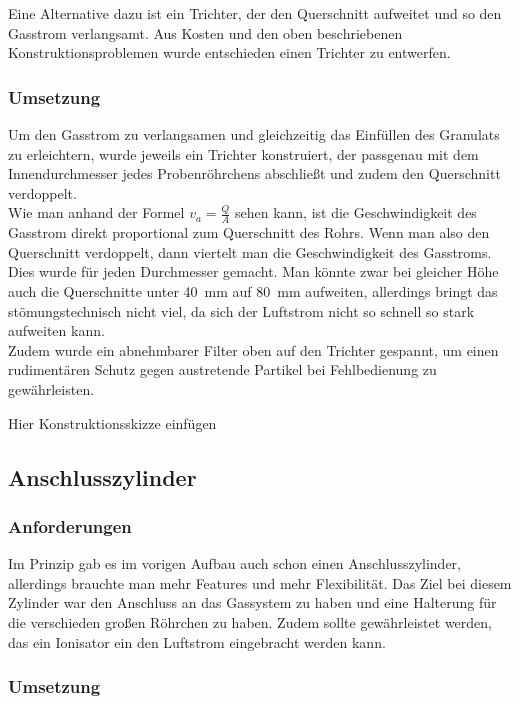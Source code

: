 Eine Alternative dazu ist ein Trichter, der den Querschnitt aufweitet und so den Gasstrom verlangsamt. Aus Kosten und den oben beschriebenen Konstruktionsproblemen wurde entschieden einen Trichter zu entwerfen.



\subsubsection{Umsetzung}

Um den Gasstrom zu verlangsamen und gleichzeitig das Einfüllen des Granulats zu erleichtern, wurde jeweils ein Trichter konstruiert, der passgenau mit dem Innendurchmesser jedes Probenröhrchens abschließt und zudem den Querschnitt verdoppelt. \\
Wie man anhand der Formel $v_a = \frac{Q}{A}$ \cite{Grollius2012} sehen kann, ist die Geschwindigkeit des Gasstrom direkt proportional zum Querschnitt des Rohrs. Wenn man also den Querschnitt verdoppelt, dann viertelt man die Geschwindigkeit des Gasstroms. Dies wurde für jeden Durchmesser gemacht. Man könnte zwar bei gleicher Höhe auch die Querschnitte unter \SI{40}{mm} auf \SI{80}{mm} aufweiten, allerdings bringt das stömungstechnisch nicht viel, da sich der Luftstrom nicht so schnell so stark aufweiten kann. \\
Zudem wurde ein abnehmbarer Filter oben auf den Trichter gespannt, um einen rudimentären Schutz gegen austretende Partikel bei Fehlbedienung zu gewährleisten.

Hier Konstruktionsskizze einfügen


\subsection{Anschlusszylinder}

\subsubsection{Anforderungen}

Im Prinzip gab es im vorigen Aufbau auch schon einen Anschlusszylinder, allerdings brauchte man mehr Features und mehr Flexibilität. Das Ziel bei diesem Zylinder war den Anschluss an das Gassystem zu haben und eine Halterung für die verschieden großen Röhrchen zu haben. Zudem sollte gewährleistet werden, das ein Ionisator ein den Luftstrom eingebracht werden kann.


\subsubsection{Umsetzung}

